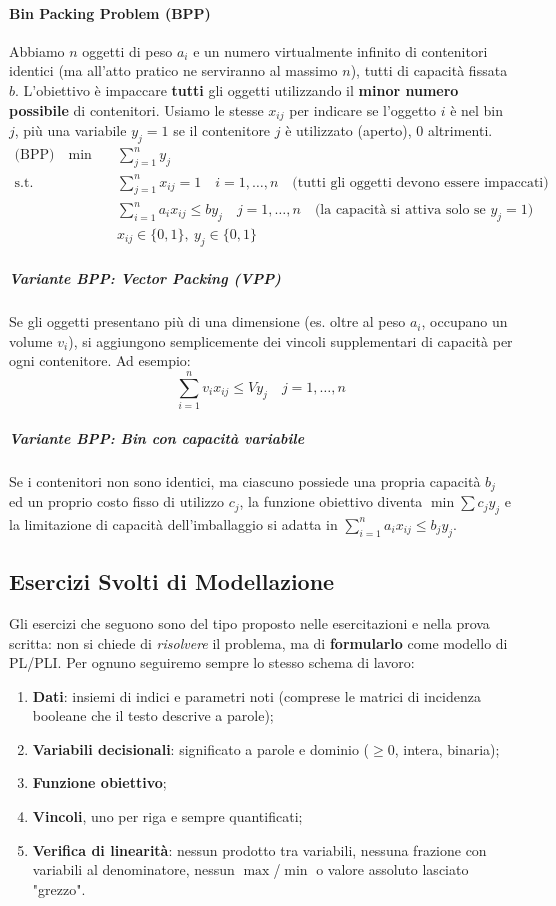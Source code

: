 \documentclass[12pt]{extarticle} %
\begin{document}
\paragraph{Bin Packing Problem (BPP)}
Abbiamo $n$ oggetti di peso $a_i$ e un numero virtualmente infinito di contenitori identici (ma all'atto pratico ne serviranno al massimo $n$), tutti di capacità fissata $b$.
L'obiettivo è impaccare \textbf{tutti} gli oggetti utilizzando il \textbf{minor numero possibile} di contenitori.
Usiamo le stesse $x_{ij}$ per indicare se l'oggetto $i$ è nel bin $j$, più una variabile $y_j = 1$ se il contenitore $j$ è utilizzato (aperto), $0$ altrimenti.
\[
\begin{aligned}
\text{(BPP)} \quad \min \quad & \sum_{j=1}^n y_j \\
\text{s.t.} \quad & \sum_{j=1}^n x_{ij} = 1 \quad i=1,\dots,n \quad \text{(tutti gli oggetti devono essere impaccati)} \\
& \sum_{i=1}^n a_i x_{ij} \le b y_j \quad j=1,\dots,n \quad \text{(la capacità si attiva solo se } y_j=1) \\
& x_{ij} \in \{0,1\}, \: y_j \in \{0,1\}
\end{aligned}
\]

\subparagraph{Variante BPP: Vector Packing (VPP)}
Se gli oggetti presentano più di una dimensione (es. oltre al peso $a_i$, occupano un volume $v_i$), si aggiungono semplicemente dei vincoli supplementari di capacità per ogni contenitore. Ad esempio:
\[
\sum_{i=1}^n v_i x_{ij} \le V y_j \quad j=1,\dots,n
\]

\subparagraph{Variante BPP: Bin con capacità variabile}
Se i contenitori non sono identici, ma ciascuno possiede una propria capacità $b_j$ ed un proprio costo fisso di utilizzo $c_j$, la funzione obiettivo diventa $\min \sum c_j y_j$ e la limitazione di capacità dell'imballaggio si adatta in $\sum_{i=1}^n a_i x_{ij} \le b_j y_j$.

\newpage

\subsection{Esercizi Svolti di Modellazione}

Gli esercizi che seguono sono del tipo proposto nelle esercitazioni e nella prova scritta: non si chiede di \textit{risolvere} il problema, ma di \textbf{formularlo} come modello di PL/PLI. Per ognuno seguiremo sempre lo stesso schema di lavoro:
\begin{enumerate}
    \item \textbf{Dati}: insiemi di indici e parametri noti (comprese le matrici di incidenza booleane che il testo descrive a parole);
    \item \textbf{Variabili decisionali}: significato a parole e dominio ($\ge 0$, intera, binaria);
    \item \textbf{Funzione obiettivo};
    \item \textbf{Vincoli}, uno per riga e sempre quantificati;
    \item \textbf{Verifica di linearità}: nessun prodotto tra variabili, nessuna frazione con variabili al denominatore, nessun $\max$/$\min$ o valore assoluto lasciato "grezzo".
\end{enumerate}
\end{document}
